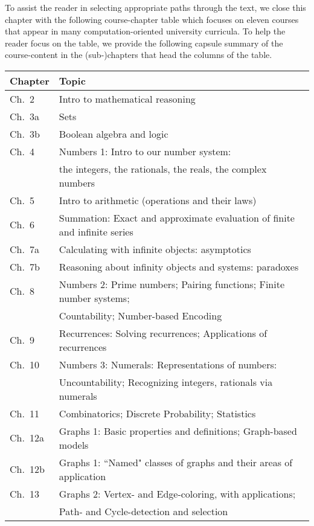 \bigskip

To assist the reader in selecting appropriate paths through the text, we close this chapter with the following course-chapter table which focuses on eleven courses that appear in many computation-oriented university curricula.  To help the reader focus on the table, we provide the following capsule summary of the course-content in the (sub-)chapters that head the columns of the table.

 \bigskip


\noindent
\begin{tabular}{|l|l|}
\hline
 {\bf Chapter} & {\bf Topic} \\
\hline
\hline
Ch.~2    & Intro to mathematical reasoning \\
Ch.~3a  & Sets \\
Ch.~3b  & Boolean algebra and logic \\
Ch.~4  & Numbers 1: Intro to our number system: \\
            & \hspace*{.67in}the integers, the rationals, the reals, the complex numbers \\
Ch.~5  &Intro to arithmetic (operations and their laws) \\
Ch.~6  & Summation: Exact and approximate evaluation of finite and infinite series   \\
Ch.~7a & Calculating with infinite objects: asymptotics \\
Ch.~7b  & Reasoning about infinity objects and systems: paradoxes \\
Ch.~8  & Numbers 2: Prime numbers; Pairing functions; Finite number systems; \\
            & \hspace*{.67in}Countability; Number-based Encoding  \\
Ch.~9  & Recurrences: Solving recurrences; Applications of recurrences \\
Ch.~10 & Numbers 3: Numerals: Representations of numbers: \\
             & \hspace*{.67in}Uncountability; Recognizing integers, rationals via numerals \\
Ch.~11  & Combinatorics; Discrete Probability; Statistics \\
Ch.~12a & Graphs 1: Basic properties and definitions; Graph-based models \\
Ch.~12b & Graphs 1: ``Named" classes of graphs and their areas of application \\
Ch.~13 & Graphs 2: Vertex- and Edge-coloring, with applications; \\
             & \hspace*{.67in}Path- and Cycle-detection and selection \\
\hline
\end{tabular}

